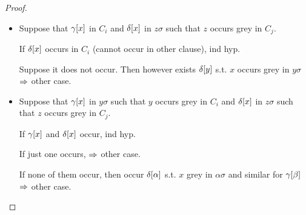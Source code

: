 \documentclass[,%
	paper=a4,%
	DIV11, %
	twoside=false,%
	liststotoc,
	bibtotoc,
	draft=false,%
	numbers=noendperiod
]{scrartcl}
\begin{document}
\begin{proof}
\begin{itemize}
		\item
			Suppose that $\gamma[x]$ in $C_i$ and $\delta[x]$ in $z\sigma$ such that $z$ occurs grey in $C_j$.

			If $\delta[x]$ occurs in $C_i$ (cannot occur in other clause), ind hyp.

			Suppose it does not occur. 
			Then however exists $\delta[y]$ s.t. $x$ occurs grey in $y\sigma$ $\Rightarrow$ other case.

		\item
			Suppose that $\gamma[x]$ in $y\sigma$ such that $y$ occurs grey in $C_i$ and $\delta[x]$ in $z\sigma$ such that $z$ occurs grey in $C_j$.

			If $\gamma[x]$ and $\delta[x]$ occur, ind hyp.

			If just one occurs, $\Rightarrow$ other case.

			If none of them occur, then occur $\delta[\alpha]$ s.t. $x$ grey in $\alpha\sigma$ and similar for $\gamma[\beta]$ $\Rightarrow$ other case.



	\end{itemize}
\end{proof}
\end{document}
